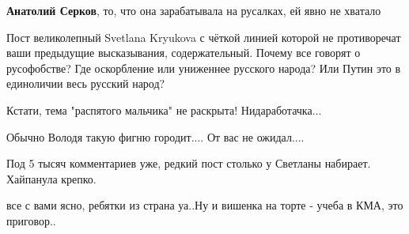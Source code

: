 \begin{itemize}
\begin{itemize}
\textbf{Анатолий Серков}, то, что она зарабатывала на русалках, ей явно не хватало
\end{itemize}

 

Пост великолепный Svetlana Kryukova с чёткой линией которой не противоречат
ваши предыдущие высказывания, содержательный. Почему все говорят о русофобстве?
Где оскорбление или униженнее русского народа? Или Путин это в единоличии весь
русский народ?


 
Кстати, тема "распятого мальчика" не раскрыта! Нидаработачка...

 
Обычно Володя такую фигню городит.... От вас не ожидал....

 
Под 5 тысяч комментариев уже, редкий пост столько у Светланы набирает. Хайпанула крепко.

 
все с вами ясно, ребятки из страна уа..Ну и вишенка на торте - учеба в КМА, это приговор..

 

\end{itemize}
